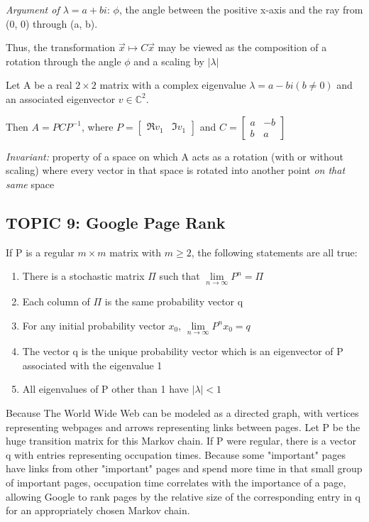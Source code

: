 \documentclass[12pt]{article} %
\begin{document}
\emph{Argument of $\lambda = a + bi$}: $\phi$, the angle between the positive x-axis and the ray from (0, 0) through (a, b). 

Thus, the transformation $\vec{x} \mapsto C\vec{x}$ may be viewed as the composition of a rotation through the angle $\phi$ and a scaling by $|\lambda|$

Let A be a real $2 \times 2$ matrix with a complex eigenvalue $\lambda = a - bi (b \neq 0)$ and an associated eigenvector $v \in \mathbb{C}^2$. 

Then
$A = PCP^{-1}$, where $P = \begin{bmatrix} 
	\Re v_1 & \Im v_1
\end{bmatrix}$ and $C = \begin{bmatrix}
	a & -b\\
	b & a
\end{bmatrix}$

\emph{Invariant:} property of a space on which A acts as a rotation (with or without scaling) where every vector in that space is rotated into another point \emph{on that same} space

\subsection{TOPIC 9: Google Page Rank}

If P is a regular $m \times m$ matrix with $m \geq 2$, the following statements are all true:
\begin{enumerate}
	\item There is a stochastic matrix $\Pi$ such that $\lim \limits_{n \to \infty} P^n = \Pi$
	\item Each column of $\Pi$ is the same probability vector q
	\item For any initial probability vector $x_0$, $\lim \limits_{n \to \infty} P^n x_0 = q$
	\item The vector q is the unique probability vector which is an eigenvector of P associated with the eigenvalue 1
	\item All eigenvalues of P other than 1 have $|\lambda| < 1$
\end{enumerate} 

Because 
The World Wide Web can be modeled as a directed graph, with vertices representing webpages and arrows representing links between pages. Let P be the huge transition matrix for this Markov chain. If P were regular, there is a vector q with entries representing occupation times. Because some "important" pages have links from other "important" pages and spend more time in that small group of important pages, occupation time correlates with the importance of a page, allowing Google to rank pages by the relative size of the corresponding entry in q for an appropriately chosen Markov chain.
\end{document}
